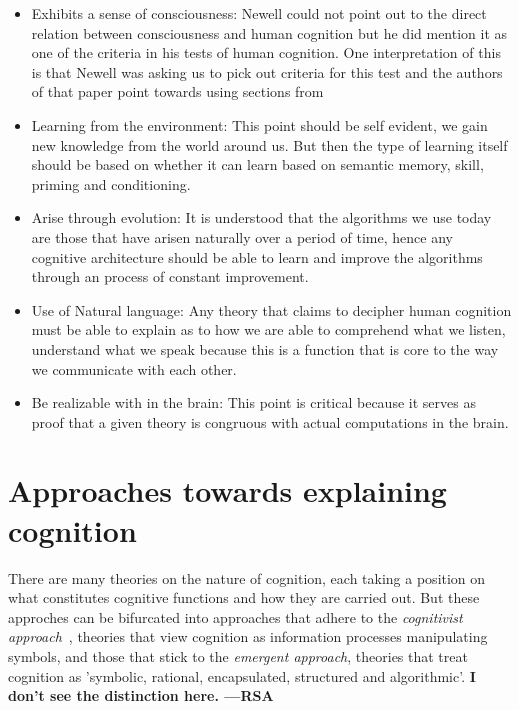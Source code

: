 \begin{itemize}
\item Exhibits a sense of consciousness: Newell could not point out to
  the direct relation between consciousness and human cognition but he
  did mention it as one of the criteria in his tests of human
  cognition. One interpretation of
  this~\cite{CambridgeJournals:207162} is that Newell was asking us to
  pick out criteria for this test and the authors of that paper point
  towards using sections from \cite{Cohen:1996aa}

\item Learning from the environment: This point should be self
evident, we gain new knowledge from the world around us. But then
the type of learning itself should be based on whether it can learn based on
semantic memory, skill, priming and conditioning.

\item Arise through evolution: It is understood that the algorithms we
use today are those that have arisen naturally over a period of time,
hence any cognitive architecture should be able to learn and improve
the algorithms through an process of constant improvement.

\item Use of Natural language: Any theory that claims to decipher human
cognition must be able to explain as to how we are able to comprehend
what we listen, understand what we speak because this is a function
that is core to the way we communicate with each other.

\item Be realizable with in the brain: This point is critical because
it serves as proof that a given theory is congruous with actual
computations in the brain.

\end{itemize}
\section{Approaches towards explaining cognition}
    There are many theories on the nature of cognition, each
    taking a position on what constitutes cognitive functions and how
    they are carried out. But these approches can be bifurcated into
    approaches that adhere to the \emph{cognitivist
    approach}~\cite{DBLP:journals/tec/VernonMS07}, theories
    that view cognition as information processes manipulating symbols,
    and those that stick to the \emph{emergent approach}, theories
    that treat cognition as 'symbolic, rational, encapsulated,
    structured and algorithmic'\cite{DBLP:journals/tec/VernonMS07}.
    {\bf I don't see the distinction here.  ---RSA}



